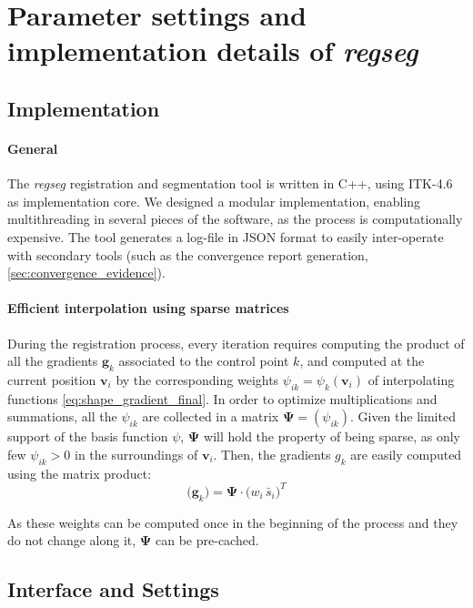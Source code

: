 \documentclass[a4paper]{report}
\renewcommand{\vec}[1]{\mathbf{#1}}
\begin{document}
\section{Parameter settings and implementation details of \emph{regseg}}

\subsection{Implementation}
\paragraph{General} The \emph{regseg} registration and segmentation tool is written in C++, using ITK-4.6 as
  implementation core.
We designed a modular implementation, enabling multithreading in several pieces of the software,
  as the process is computationally expensive.
The tool generates a log-file in JSON format to easily inter-operate with secondary tools (such
  as the convergence report generation, \autoref{sec:convergence_evidence}).

\paragraph{Efficient interpolation using sparse matrices}
During the registration process, every iteration requires computing the product of all the gradients
  $\vec{g}_k$ associated to the control point $k$, and computed at the current position
  $\vec{v}_i$ by the corresponding weights $\psi_{ik} = \psi_k(\mathbf{v}_i)$ of interpolating functions
  \eqref{eq:shape_gradient_final}.
In order to optimize multiplications and summations, all the $\psi_{ik}$ are collected in a
  matrix $\boldsymbol{\Psi} = (\psi_{ik})$.
Given the limited support of the basis function $\psi$, $\boldsymbol{\Psi}$ will hold the property
  of being sparse, as only few $\psi_{ik} > 0$ in the surroundings of $\vec{v}_i$.
Then, the gradients $g_k$ are easily computed using the matrix product:
\begin{equation}
  \big(\vec{g}_k \big) = \boldsymbol{\Psi} \cdot \big( w_i \, \bar{s}_i \big)^T
  \label{eq:sparse_matrix}
\end{equation}

As these weights can be computed once in the beginning of the process and they do not change along
  it, $\boldsymbol{\Psi}$ can be pre-cached.

\subsection{Interface and Settings}\label{sec:interface_settings}
\end{document}
